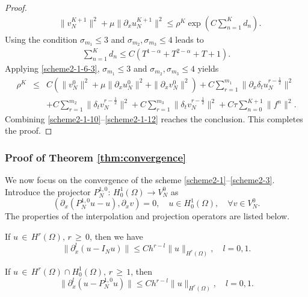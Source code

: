 \documentclass[10pt]{siamltex}
\newcommand{\px}[1][x]{\partial_{#1}}
\newcommand{\mfrac}[1][2]{\frac{1}{2}}
\begin{document}
\begin{proof}
\begin{equation}\label{scheme2-1-10}\begin{aligned}
&\|v_N^{K+1}\|^2 +\mu\|\px[x]u_N^{K+1}\|^2\leq
\rho^K\exp\left(C\sum_{n=1}^Kd_n\right).
\end{aligned}\end{equation}
Using the condition $\sigma_{m_1}\leq 3$ and $\sigma_{m_2},\sigma_{m_3}\leq 4$
leads to
\begin{equation}\label{scheme2-1-11}\begin{aligned}
\sum_{n=1}^Kd_n\leq C(T^{1-\alpha}+T^{2-\alpha}+T+1).
\end{aligned}\end{equation}
Applying \eqref{scheme2-1-6-3},
$\sigma_{m_1}\leq 3$ and $\sigma_{m_2},\sigma_{m_3}\leq 4$  yields
\begin{eqnarray}
\rho^K&\leq& C(\|v_N^{0}\|^2 +\mu\|\px[x]u_N^{0}\|^2+\|\px[x]v_N^{0}\|^2)
+C\sum_{r=1}^{m_1} \|\px[x]\delta_tu_N^{r-\mfrac}\|^2\nonumber\\
&&+C \sum_{r=1}^{m_2}\|\delta_tv_N^{r-\mfrac}\|^2+C \sum_{r=1}^{m_3}\|\delta_tv_N^{r-\mfrac}\|^2
+C\tau\sum_{n=0}^{K+1}\|f^{n}\|^2.\label{scheme2-1-12}
\end{eqnarray}
Combining \eqref{scheme2-1-10}--\eqref{scheme2-1-12}
reaches the conclusion.
This completes the proof.
 \end{proof}

\subsubsection{Proof of  Theorem \ref{thm:convergence}}
We now focus on the convergence of the scheme \eqref{scheme2-1}--\eqref{scheme2-3}.
Introduce the projector $P_N^{1,0}$: $H^1_0(\Omega)\to V_N^0$ as
\begin{equation}
(\px (P_N^{1,0}u-u),\px v)=0,{\quad}u\in H^1_0(\Omega),{\quad}\forall v \in V_N^0.
\end{equation}
The properties of the interpolation and  projection operators are listed below.
\begin{lemma}\label{lem2-1}
If $u{\,\in\,}{H^{r}(\Omega)},\,r{\,\geq\,}0$, then
we have
\begin{equation} \nonumber
\big\|{\px^{l}(u-I_Nu)}\big\|
{\leq}Ch^{r-l}\|{u}\|_{H^{r}(\Omega)},{\quad}l=0,1.
\end{equation}
\end{lemma}

\begin{lemma}\label{lem2-2}
If $u{\,\in\,}{H^{r}(\Omega)}\cap{H^1_0(\Omega)},\,r{\,\geq\,}1$,
then
\begin{equation} \nonumber
\big\|{\px^{l}(u-P_N^{1,0}u)}\big\|
{\leq}Ch^{r-l}\|{u}\|_{H^{r}(\Omega)},{\quad}l=0,1.
\end{equation}
\end{lemma}
\end{document}
